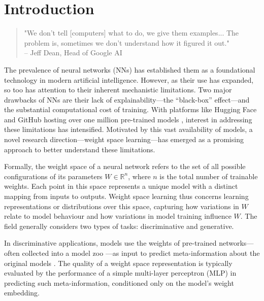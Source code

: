 \graphicspath{{introduction/fig/}}

\chapter{Introduction}
\label{chap:introduction}

\begin{quote}
    "We don't tell [computers] what to do, we give them examples... The problem is, sometimes we don't understand how it figured it out."\\ %
    \vspace{0.5em} %
    \hfill -- Jeff Dean, Head of Google AI \cite{Dean2017BlackBox}
\end{quote}

The prevalence of neural networks (NNs) has established them as a foundational technology in modern artificial intelligence. However, as their use has expanded, so too has attention to their inherent mechanistic limitations. Two major drawbacks of NNs are their lack of explainability—the “black-box” effect—and the substantial computational cost of training. With platforms like Hugging Face and GitHub hosting over one million pre-trained models \cite{huggingface2024review}, interest in addressing these limitations has intensified. Motivated by this vast availability of models, a novel research direction—weight space learning—has emerged as a promising approach to better understand these limitations.

Formally, the weight space of a neural network refers to the set of all possible configurations of its parameters \( W \in \mathbb{R}^n \), where \( n \) is the total number of trainable weights. Each point in this space represents a unique model with a distinct mapping from inputs to outputs. Weight space learning thus concerns learning representations or distributions over this space, capturing how variations in \( W \) relate to model behaviour and how variations in model training influence \( W \). The field generally considers two types of tasks: discriminative and generative.

In discriminative applications, models use the weights of pre-trained networks—often collected into a model zoo \cite{schurholt2022modelzoosdatasetdiverse}—as input to predict meta-information about the original models \cite{unterthiner2021predictingneuralnetworkaccuracy}. The quality of a weight space representation is typically evaluated by the performance of a simple multi-layer perceptron (MLP) in predicting such meta-information, conditioned only on the model's weight embedding.


